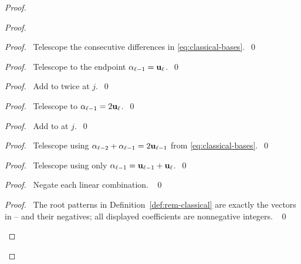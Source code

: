 \begin{proof}
\begin{proof}
\begin{proof}\pf\ Telescope the consecutive differences in
\eqref{eq:classical-bases}.~\qed\end{proof}
\begin{proof}\pf\ Telescope to the endpoint $\alpha_{\ell-1}={\mathbf u}_\ell$.~\qed\end{proof}
\begin{proof}\pf\ Add  to twice 
at $j$.~\qed\end{proof}
\begin{proof}\pf\ Telescope to $\alpha_{\ell-1}=2{\mathbf u}_\ell$.~\qed\end{proof}
\begin{proof}\pf\ Add  to  at $j$.~\qed\end{proof}
\begin{proof}\pf\ Telescope using
$\alpha_{\ell-2}+\alpha_{\ell-1}=2{\mathbf u}_{\ell-1}$
from \eqref{eq:classical-bases}.~\qed\end{proof}
\begin{proof}\pf\ Telescope using only
$\alpha_{\ell-1}={\mathbf u}_{\ell-1}+{\mathbf u}_\ell$.~\qed\end{proof}
\begin{proof}\pf\ Negate each linear combination. ~\qed\end{proof}
\qedstep
\begin{proof}\pf\ The root patterns in Definition~\ref{def:rem-classical}
are exactly the vectors in --
and their negatives; all displayed coefficients are nonnegative integers. ~\qed\end{proof}
\end{proof}

\end{proof}
